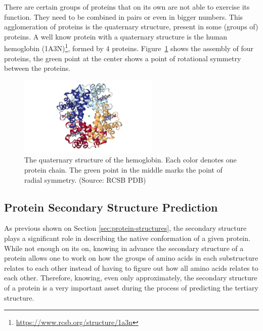 
There are certain groups of proteins that on its own are not able to exercise its function. They need to be combined in pairs or even in bigger numbers. This agglomeration of proteins is the quaternary structure, present in some (groups of) proteins. A well know protein with a quaternary structure is the human hemoglobin (1A3N)\footnote{\url{https://www.rcsb.org/structure/1a3n}}, formed by 4 proteins. Figure~\ref{fig:human-hemoglobin} shows the assembly of four proteins, the green point at the center shows a point of rotational symmetry between the proteins.

\begin{figure}
    \centering
    \includegraphics[width=0.6\textwidth]{Figuras/1a3n.png}
    \caption{The quaternary structure of the hemoglobin. Each color denotes one protein chain. The green point in the middle marks the point of radial symmetry. (Source: RCSB PDB)}
    \label{fig:human-hemoglobin}
\end{figure}

\subsection{Protein Secondary Structure Prediction}
\label{sec:secondary-structure-prediction}

As previous shown on Section \ref{sec:protein-structures}, the secondary structure plays a significant role in describing the native conformation of a given protein. While not enough on its on, knowing in advance the secondary structure of a protein allows one to work on how the groups of amino acids in each substructure relates to each other instead of having to figure out how all amino acids relates to each other. Therefore, knowing, even only approximately, the secondary structure of a protein is a very important asset during the process of predicting the tertiary structure.

